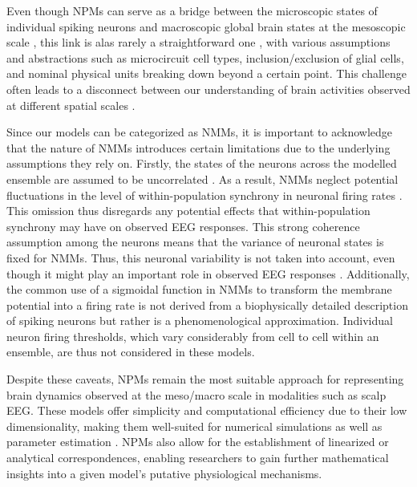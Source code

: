 \documentclass[12pt,twoside]{article}
\begin{document}
Even though NPMs can serve as a bridge between the microscopic states of individual spiking neurons and macroscopic global brain states at the mesoscopic scale \citep{goldman2019bridging}, this link is alas rarely a straightforward one \citep{huang2021novel}, with various assumptions and abstractions such as microcircuit cell types, inclusion/exclusion of glial cells, and nominal physical units breaking down beyond a certain point. This challenge often leads to a disconnect between our understanding of brain activities observed at different spatial scales \citep{cook2021neural}.

Since our models can be categorized as NMMs, it is important to acknowledge that the nature of NMMs introduces certain limitations due to the underlying assumptions they rely on. Firstly, the states of the neurons across the modelled ensemble are assumed to be uncorrelated \citep{breakspear2017dynamic}. As a result, NMMs neglect potential fluctuations in the level of within-population synchrony in neuronal firing rates \citep{glomb2021computational}. This omission thus disregards any potential effects that within-population synchrony may have on observed EEG responses. This strong coherence assumption among the neurons means that the variance of neuronal states is fixed for NMMs. Thus, this neuronal variability is not taken into account, even though it might play an important role in observed EEG responses \citep{marreiros2008population}. %
Additionally, the common use of a sigmoidal function in NMMs to transform the membrane potential into a firing rate is not derived from a biophysically detailed description of spiking neurons \citep{huang2021novel, byrne2020next} but rather is a phenomenological approximation. Individual neuron firing thresholds, which vary considerably from cell to cell within an ensemble, are thus not considered in these models. 

Despite these caveats, NPMs remain the most suitable approach for representing brain dynamics observed at the meso/macro scale in modalities such as scalp EEG. These models offer simplicity and computational efficiency due to their low dimensionality, making them well-suited for numerical simulations as well as parameter estimation \citep{david2006mechanisms, abeysuriya2014prediction, momi2023tms}. NPMs also allow for the establishment of linearized or analytical correspondences, enabling researchers to gain further mathematical insights into a given model's putative physiological mechanisms. %
\end{document}
